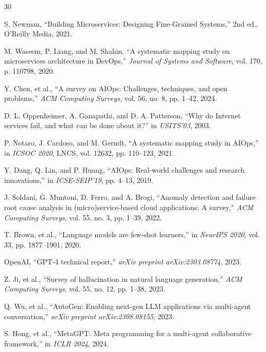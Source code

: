 \documentclass[journal]{IEEEtran}
\begin{document}

\begin{thebibliography}{30}

S. Newman, ``Building Microservices: Designing Fine-Grained Systems,'' 2nd ed., O'Reilly Media, 2021.

M. Waseem, P. Liang, and M. Shahin, ``A systematic mapping study on microservices architecture in DevOps,'' \textit{Journal of Systems and Software}, vol. 170, p. 110798, 2020.

Y. Chen, et al., ``A survey on AIOps: Challenges, techniques, and open problems,'' \textit{ACM Computing Surveys}, vol. 56, no. 8, pp. 1--42, 2024.

D. L. Oppenheimer, A. Ganapathi, and D. A. Patterson, ``Why do Internet services fail, and what can be done about it?'' in \textit{USITS'03}, 2003.

P. Notaro, J. Cardoso, and M. Gerndt, ``A systematic mapping study in AIOps,'' in \textit{ICSOC 2020}, LNCS, vol. 12632, pp. 110--123, 2021.

Y. Dang, Q. Lin, and P. Huang, ``AIOps: Real-world challenges and research innovations,'' in \textit{ICSE-SEIP'19}, pp. 4--13, 2019.

J. Soldani, G. Muntoni, D. Ferro, and A. Brogi, ``Anomaly detection and failure root cause analysis in (micro)service-based cloud applications: A survey,'' \textit{ACM Computing Surveys}, vol. 55, no. 3, pp. 1--39, 2022.

T. Brown, et al., ``Language models are few-shot learners,'' in \textit{NeurIPS 2020}, vol. 33, pp. 1877--1901, 2020.

OpenAI, ``GPT-4 technical report,'' \textit{arXiv preprint arXiv:2303.08774}, 2023.

Z. Ji, et al., ``Survey of hallucination in natural language generation,'' \textit{ACM Computing Surveys}, vol. 55, no. 12, pp. 1--38, 2023.

Q. Wu, et al., ``AutoGen: Enabling next-gen LLM applications via multi-agent conversation,'' \textit{arXiv preprint arXiv:2308.08155}, 2023.

S. Hong, et al., ``MetaGPT: Meta programming for a multi-agent collaborative framework,'' in \textit{ICLR 2024}, 2024.


\end{thebibliography}
\end{document}
